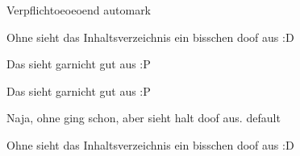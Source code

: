 



\RequirePackage{LILLYxCONTROLLERxBOX}


					{Verpflichtoeoeoend}
					{automark}{}

                    {Ohne sieht das Inhaltsverzeichnis ein bisschen doof aus :D}
                    {}{}

                    {Das sieht garnicht gut aus :P}
					{}{}

					{Das sieht garnicht gut aus :P}
					{}{}

					{Naja, ohne ging schon, aber sieht halt doof aus.}
                    {\def\lfseries{\normalfont}}
                    {default}{\def\lfseries{\fontseries{l}\selectfont}}

                    {Ohne sieht das Inhaltsverzeichnis ein bisschen doof aus :D}
                    {} %
                    {}{}



\def\LILLYxRIGHTMARK{Inhalts\"{u}bersicht}

\def\SetStyle{%
	\pagenumbering{arabic}%
	\pagestyle{scrheadings}%
	\clearscrheadfoot%
	\ofoot{\textbf{\thepage}}%
	\lofoot{\lfseries{\LILLYxRIGHTMARK}}%
	\refoot{\lfseries{\leftmark}}%
}

